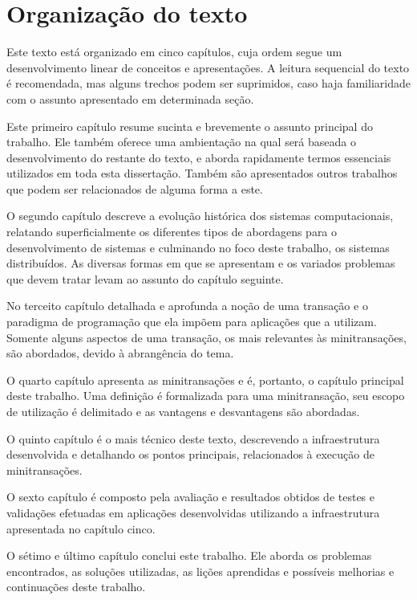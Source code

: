 \documentclass[11pt,twoside,a4paper]{book}
\begin{document}
\section{Organização do texto}
\label{sec:organizacao_do_texto}
Este texto está organizado em cinco capítulos, cuja ordem segue um desenvolvimento linear de conceitos e apresentações. A leitura sequencial do texto é recomendada, mas alguns trechos podem ser suprimidos, caso haja familiaridade com o assunto apresentado em determinada seção.

Este primeiro capítulo resume sucinta e brevemente o assunto principal do trabalho. Ele também oferece uma ambientação na qual será baseada o desenvolvimento do restante do texto, e aborda rapidamente termos essenciais utilizados em toda esta dissertação. Também são apresentados outros trabalhos que podem ser relacionados de alguma forma a este.

O segundo capítulo descreve a evolução histórica dos sistemas computacionais, relatando superficialmente os diferentes tipos de abordagens para o desenvolvimento de sistemas e culminando no foco deste trabalho, os sistemas distribuídos. As diversas formas em que se apresentam e os variados problemas que devem tratar levam ao assunto do capítulo seguinte.

No terceito capítulo detalhada e aprofunda a noção de uma transação e o paradigma de programação que ela impõem para aplicações que a utilizam. Somente alguns aspectos de uma transação, os mais relevantes às minitransações, são abordados, devido à abrangência do tema.

O quarto capítulo apresenta as minitransações e é, portanto, o capítulo principal deste trabalho. Uma definição é formalizada para uma minitransação, seu escopo de utilização é delimitado e as vantagens e desvantagens são abordadas.

O quinto capítulo é o mais técnico deste texto, descrevendo a infraestrutura desenvolvida e detalhando os pontos principais, relacionados à execução de minitransações. %

O sexto capítulo é composto pela avaliação e resultados obtidos de testes e validações efetuadas em aplicações desenvolvidas utilizando a infraestrutura apresentada no capítulo cinco.

O sétimo e último capítulo conclui este trabalho. Ele aborda os problemas encontrados, as soluções utilizadas, as lições aprendidas e possíveis melhorias e continuações deste trabalho.
\end{document}
